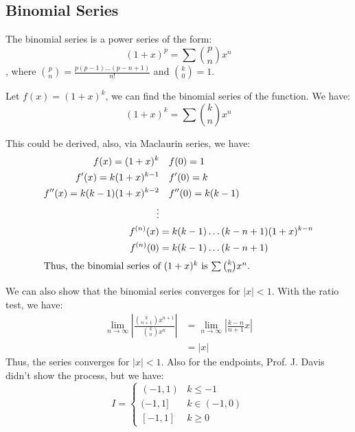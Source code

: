 \documentclass[11pt]{article}
\begin{document}
\subsection{Binomial Series}
\begin{definition}
    The binomial series is a power series of the form:
    \begin{equation}
        (1+x)^p = \sum \binom{p}{n} x^n
    \end{equation}
    , where $\binom{p}{n} = \frac{p(p-1)\ldots(p-n+1)}{n!}$ and $\binom{k}{0} = 1$.
\end{definition}
\begin{example}[$(1+x)^k$]
    Let $f(x) = (1+x)^k$, we can find the binomial series of the function. We have:
    $$
    (1+x)^k = \sum \binom{k}{n} x^n
    $$

    This could be derived, also, via Maclaurin series, we have:
    \begin{align*}
        f(x) = (1+x)^k &\quad f(0) = 1 \\
        f'(x) = k(1+x)^{k-1} &\quad f'(0) = k \\
        f''(x) = k(k-1)(1+x)^{k-2} &\quad f''(0) = k(k-1) \\
        \vdots \\
        f^{(n)}(x) &= k(k-1)\ldots(k-n+1)(1+x)^{k-n} \\
        f^{(n)}(0) &= k(k-1)\ldots(k-n+1) \\
        \intertext{Thus, the binomial series of $(1+x)^k$ is $\sum \binom{k}{n} x^n$.}
    \end{align*}

    We can also show that the binomial series converges for $|x| < 1$. With the ratio test, we have:
    \begin{align*}
        \lim_{n \to \infty} \left| \frac{\binom{k}{n+1} x^{n+1}}{\binom{k}{n} x^n} \right| &= \lim_{n \to \infty} \left| \frac{k-n}{n+1} x \right| \\
        &= |x|
    \end{align*}
    Thus, the series converges for $|x| < 1$. Also for the endpoints, Prof. J. Davis didn't show the process, but we have:
    $$
    I = \begin{cases}
        (-1, 1) & k \le -1 \\
        (-1, 1] & k \in (-1, 0) \\
        [-1, 1] & k \ge 0
    \end{cases}
    $$
\end{example}
\end{document}
